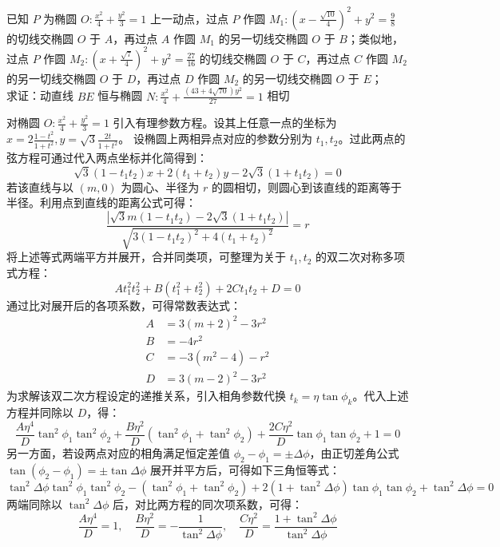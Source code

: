 \begin{exercise}
已知 \(P\) 为椭圆 \(O: \frac{x^2}{4} + \frac{y^2}{3} = 1\) 上一动点，过点 \(P\) 作圆 \(M_1: \left(x - \frac{\sqrt{10}}{4}\right)^2 + y^2 = \frac{9}{8}\) 的切线交椭圆 \(O\) 于 \(A\)，再过点 \(A\) 作圆 \(M_1\) 的另一切线交椭圆 \(O\) 于 \(B\)；类似地，过点 \(P\) 作圆 \(M_2: \left(x + \frac{\sqrt{7}}{4}\right)^2 + y^2 = \frac{27}{16}\) 的切线交椭圆 \(O\) 于 \(C\)，再过点 \(C\) 作圆 \(M_2\) 的另一切线交椭圆 \(O\) 于 \(D\)，再过点 \(D\) 作圆 \(M_2\) 的另一切线交椭圆 \(O\) 于 \(E\)；\\
求证：动直线 \(BE\) 恒与椭圆 \(N: \frac{x^2}{4} + \frac{(43 + 4\sqrt{70})y^2}{27} = 1\) 相切
\end{exercise}
\begin{solution}
对椭圆 $O: \frac{x^2}{4} + \frac{y^2}{3} = 1$ 引入有理参数方程。设其上任意一点的坐标为 $x = 2 \frac{1-t^2}{1+t^2}, y = \sqrt{3} \frac{2t}{1+t^2}$。
设椭圆上两相异点对应的参数分别为 $t_1, t_2$。过此两点的弦方程可通过代入两点坐标并化简得到：
$$ \sqrt{3}(1 - t_1 t_2)x + 2(t_1 + t_2)y - 2\sqrt{3}(1 + t_1 t_2) = 0 $$
若该直线与以 $(m, 0)$ 为圆心、半径为 $r$ 的圆相切，则圆心到该直线的距离等于半径。利用点到直线的距离公式可得：
$$ \frac{|\sqrt{3}m(1 - t_1 t_2) - 2\sqrt{3}(1 + t_1 t_2)|}{\sqrt{3(1 - t_1 t_2)^2 + 4(t_1 + t_2)^2}} = r $$
将上述等式两端平方并展开，合并同类项，可整理为关于 $t_1, t_2$ 的双二次对称多项式方程：
$$ A t_1^2 t_2^2 + B(t_1^2+t_2^2) + 2C t_1 t_2 + D = 0 $$
通过比对展开后的各项系数，可得常数表达式：
\begin{align*}
A &= 3(m+2)^2 - 3r^2 \\
B &= -4r^2 \\
C &= -3(m^2-4) - r^2 \\
D &= 3(m-2)^2 - 3r^2
\end{align*}
为求解该双二次方程设定的递推关系，引入相角参数代换 $t_k = \eta \tan\phi_k$。代入上述方程并同除以 $D$，得：
$$ \frac{A\eta^4}{D}\tan^2\phi_1\tan^2\phi_2 + \frac{B\eta^2}{D}(\tan^2\phi_1+\tan^2\phi_2) + \frac{2C\eta^2}{D}\tan\phi_1\tan\phi_2 + 1 = 0 $$
另一方面，若设两点对应的相角满足恒定差值 $\phi_2 - \phi_1 = \pm\Delta\phi$，由正切差角公式 $\tan(\phi_2-\phi_1) = \pm\tan\Delta\phi$ 展开并平方后，可得如下三角恒等式：
$$ \tan^2\Delta\phi \tan^2\phi_1 \tan^2\phi_2 - (\tan^2\phi_1 + \tan^2\phi_2) + 2(1+\tan^2\Delta\phi) \tan\phi_1 \tan\phi_2 + \tan^2\Delta\phi = 0 $$
两端同除以 $\tan^2\Delta\phi$ 后，对比两方程的同次项系数，可得：
$$ \frac{A\eta^4}{D} = 1, \quad \frac{B\eta^2}{D} = -\frac{1}{\tan^2\Delta\phi}, \quad \frac{C\eta^2}{D} = \frac{1+\tan^2\Delta\phi}{\tan^2\Delta\phi} $$

\end{solution}
